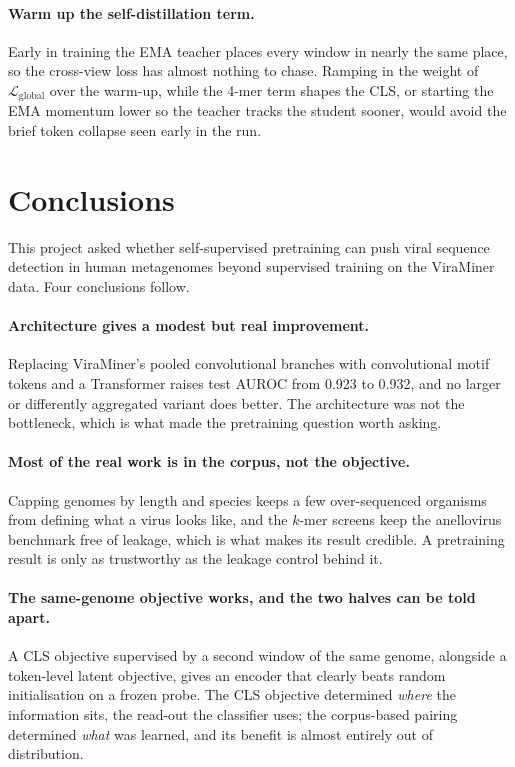 \documentclass[10pt,twocolumn,a4paper]{article}
\begin{document}
\paragraph{Warm up the self-distillation term.}
Early in training the EMA teacher places every window in nearly the same place,
so the cross-view loss has almost nothing to chase. Ramping in the weight of
$\mathcal{L}_{\text{global}}$ over the warm-up, while the 4-mer term shapes the
CLS, or starting the EMA momentum lower so the teacher tracks the student sooner,
would avoid the brief token collapse seen early in the run.

\section{Conclusions}\label{sec:conclusions}

This project asked whether self-supervised pretraining can push viral sequence
detection in human metagenomes beyond supervised training on the ViraMiner data.
Four conclusions follow.

\paragraph{Architecture gives a modest but real improvement.}
Replacing ViraMiner's pooled convolutional branches with convolutional motif
tokens and a Transformer raises test AUROC from 0.923 to 0.932, and no larger or
differently aggregated variant does better. The architecture was not the
bottleneck, which is what made the pretraining question worth asking.

\paragraph{Most of the real work is in the corpus, not the objective.}
Capping genomes by length and species keeps a few over-sequenced organisms from
defining what a virus looks like, and the $k$-mer screens keep the anellovirus
benchmark free of leakage, which is what makes its result credible. A
pretraining result is only as trustworthy as the leakage control behind it.

\paragraph{The same-genome objective works, and the two halves can be told apart.}
A CLS objective supervised by a second window of the same genome, alongside a
token-level latent objective, gives an encoder that clearly beats random
initialisation on a frozen probe. The CLS objective determined \emph{where} the
information sits, the read-out the classifier uses; the corpus-based pairing
determined \emph{what} was learned, and its benefit is almost entirely out of
distribution.
\end{document}
